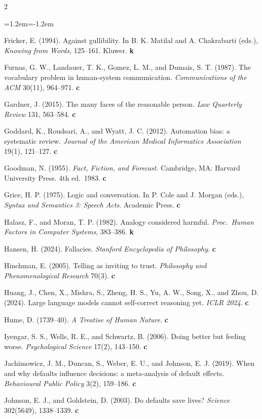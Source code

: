 \documentclass[11pt,a4paper]{article}
\newcounter{art}
\begin{document}
\begin{multicols}{2}
\begin{list}{}{\leftmargin=1.2em\itemindent=-1.2em\itemsep=1pt}
\item Fricker, E. (1994). Against gullibility. In B. K. Matilal and A. Chakrabarti (eds.), \textit{Knowing from Words}, 125--161. Kluwer. \textbf{k}
\item Furnas, G. W., Landauer, T. K., Gomez, L. M., and Dumais, S. T. (1987). The vocabulary problem in human-system communication. \textit{Communications of the ACM} 30(11), 964--971. \textbf{c}
\item Gardner, J. (2015). The many faces of the reasonable person. \textit{Law Quarterly Review} 131, 563--584. \textbf{c}
\item Goddard, K., Roudsari, A., and Wyatt, J. C. (2012). Automation bias: a systematic review. \textit{Journal of the American Medical Informatics Association} 19(1), 121--127. \textbf{c}
\item Goodman, N. (1955). \textit{Fact, Fiction, and Forecast}. Cambridge, MA: Harvard University Press. 4th ed.\ 1983. \textbf{c}
\item Grice, H. P. (1975). Logic and conversation. In P. Cole and J. Morgan (eds.), \textit{Syntax and Semantics 3: Speech Acts}. Academic Press. \textbf{c}
\item Halasz, F., and Moran, T. P. (1982). Analogy considered harmful. \textit{Proc.\ Human Factors in Computer Systems}, 383--386. \textbf{k}
\item Hansen, H. (2024). Fallacies. \textit{Stanford Encyclopedia of Philosophy}. \textbf{c}
\item Hinchman, E. (2005). Telling as inviting to trust. \textit{Philosophy and Phenomenological Research} 70(3). \textbf{c}
\item Huang, J., Chen, X., Mishra, S., Zheng, H. S., Yu, A. W., Song, X., and Zhou, D. (2024). Large language models cannot self-correct reasoning yet. \textit{ICLR 2024}. \textbf{c}
\item Hume, D. (1739--40). \textit{A Treatise of Human Nature}. \textbf{c}
\item Iyengar, S. S., Wells, R. E., and Schwartz, B. (2006). Doing better but feeling worse. \textit{Psychological Science} 17(2), 143--150. \textbf{c}
\item Jachimowicz, J. M., Duncan, S., Weber, E. U., and Johnson, E. J. (2019). When and why defaults influence decisions: a meta-analysis of default effects. \textit{Behavioural Public Policy} 3(2), 159--186. \textbf{c}
\item Johnson, E. J., and Goldstein, D. (2003). Do defaults save lives? \textit{Science} 302(5649), 1338--1339. \textbf{c}

\end{list}
\end{multicols}
\end{document}
